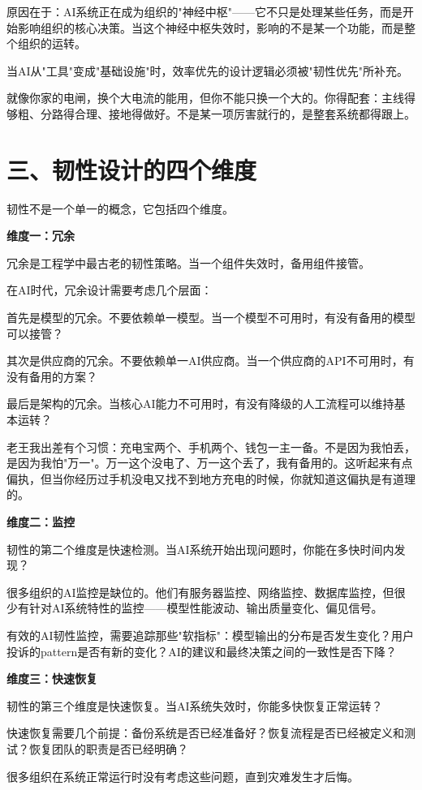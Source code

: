 原因在于：AI系统正在成为组织的"神经中枢"——它不只是处理某些任务，而是开始影响组织的核心决策。当这个神经中枢失效时，影响的不是某一个功能，而是整个组织的运转。

当AI从"工具"变成"基础设施"时，效率优先的设计逻辑必须被"韧性优先"所补充。

就像你家的电闸，换个大电流的能用，但你不能只换一个大的。你得配套：主线得够粗、分路得合理、接地得做好。不是某一项厉害就行的，是整套系统都得跟上。

\section{三、韧性设计的四个维度}


韧性不是一个单一的概念，它包括四个维度。

\textbf{维度一：冗余}

冗余是工程学中最古老的韧性策略。当一个组件失效时，备用组件接管。

在AI时代，冗余设计需要考虑几个层面：

首先是模型的冗余。不要依赖单一模型。当一个模型不可用时，有没有备用的模型可以接管？

其次是供应商的冗余。不要依赖单一AI供应商。当一个供应商的API不可用时，有没有备用的方案？

最后是架构的冗余。当核心AI能力不可用时，有没有降级的人工流程可以维持基本运转？

老王我出差有个习惯：充电宝两个、手机两个、钱包一主一备。不是因为我怕丢，是因为我怕"万一"。万一这个没电了、万一这个丢了，我有备用的。这听起来有点偏执，但当你经历过手机没电又找不到地方充电的时候，你就知道这偏执是有道理的。

\textbf{维度二：监控}

韧性的第二个维度是快速检测。当AI系统开始出现问题时，你能在多快时间内发现？

很多组织的AI监控是缺位的。他们有服务器监控、网络监控、数据库监控，但很少有针对AI系统特性的监控——模型性能波动、输出质量变化、偏见信号。

有效的AI韧性监控，需要追踪那些"软指标"：模型输出的分布是否发生变化？用户投诉的pattern是否有新的变化？AI的建议和最终决策之间的一致性是否下降？

\textbf{维度三：快速恢复}

韧性的第三个维度是快速恢复。当AI系统失效时，你能多快恢复正常运转？

快速恢复需要几个前提：备份系统是否已经准备好？恢复流程是否已经被定义和测试？恢复团队的职责是否已经明确？

很多组织在系统正常运行时没有考虑这些问题，直到灾难发生才后悔。

